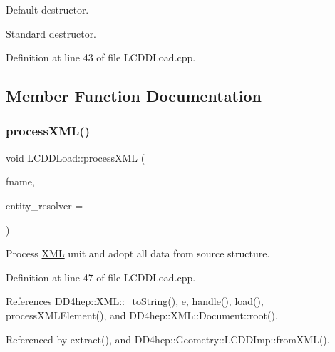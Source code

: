 Default destructor. 

Standard destructor. 

Definition at line 43 of file L\+C\+D\+D\+Load.\+cpp.



\subsection{Member Function Documentation}
\hypertarget{class_d_d4hep_1_1_l_c_d_d_load_a7d15299b8ebc6817f3a8c2bf756422b4}{}\label{class_d_d4hep_1_1_l_c_d_d_load_a7d15299b8ebc6817f3a8c2bf756422b4} 
\subsubsection{\texorpdfstring{process\+X\+M\+L()}{processXML()}\hspace{0.1cm}{\footnotesize\ttfamily [1/2]}}
{\footnotesize\ttfamily void L\+C\+D\+D\+Load\+::process\+X\+ML (\begin{DoxyParamCaption}\item[{const std\+::string \&}]{fname,  }\item[{\hyperlink{class_d_d4hep_1_1_x_m_l_1_1_uri_reader}{X\+M\+L\+::\+Uri\+Reader} $\ast$}]{entity\+\_\+resolver = {} }\end{DoxyParamCaption})\hspace{0.3cm}{\ttfamily [virtual]}}



Process \hyperlink{namespace_d_d4hep_1_1_x_m_l}{X\+ML} unit and adopt all data from source structure. 



Definition at line 47 of file L\+C\+D\+D\+Load.\+cpp.



References D\+D4hep\+::\+X\+M\+L\+::\+\_\+to\+String(), e, handle(), load(), process\+X\+M\+L\+Element(), and D\+D4hep\+::\+X\+M\+L\+::\+Document\+::root().



Referenced by extract(), and D\+D4hep\+::\+Geometry\+::\+L\+C\+D\+D\+Imp\+::from\+X\+M\+L().

\hypertarget{class_d_d4hep_1_1_l_c_d_d_load_aafc1d3cf48aa3e8a7446e66a0ed93e04}{}\label{class_d_d4hep_1_1_l_c_d_d_load_aafc1d3cf48aa3e8a7446e66a0ed93e04} 

